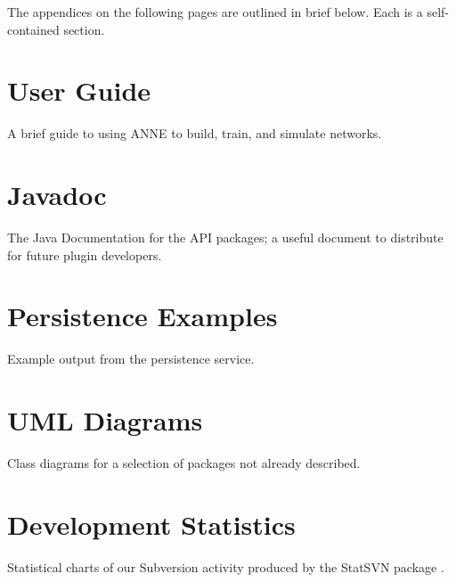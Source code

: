 \documentclass{acm_proc_article-sp}
\begin{document}
\appendix
{
The appendices on the following pages are outlined in brief below. Each is a self{}-contained section.
}

\section{User Guide}
\label{appendix:userguide}
{
A brief guide to using ANNE to build, train, and simulate networks.
}

\section{Javadoc}
\label{appendix:javadoc}
{
The Java Documentation for the API packages; a useful document to distribute for future plugin developers.
}

\section{Persistence Examples}
\label{appendix:persistence:eg}
{
Example output from the persistence service.
}

\section{UML Diagrams}
\label{appendix:uml}
{
Class diagrams for a selection of packages not already described.
}

\section{Development Statistics}
\label{appendix:stats}
{
Statistical charts of our Subversion activity produced by the StatSVN package \cite{statsvn}.
}

\balancecolumns

\end{document}
